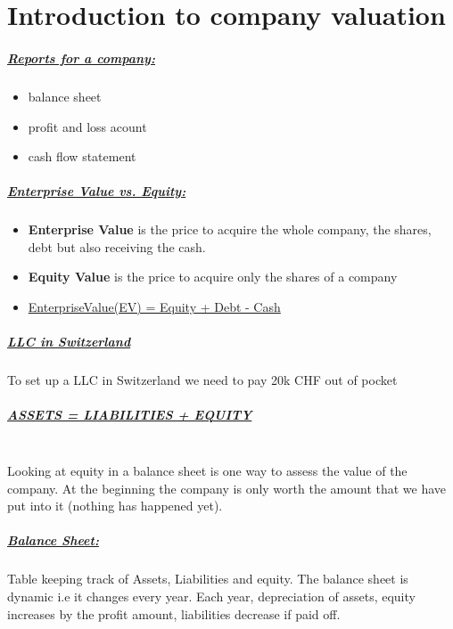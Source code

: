 \documentclass[8pt]{extreport}
\begin{document}
{\chapter{\Large{Introduction to company valuation}}
\paragraph{\underline{Reports for a company:}}
\begin{itemize}
\item balance sheet
\item profit and loss acount 
\item cash flow statement
\end{itemize}

\paragraph{\underline{Enterprise Value vs. Equity:}}
\begin{itemize}
\item \textbf{Enterprise Value} is the price to acquire the whole company, the shares, debt but also receiving the cash.
\item \textbf{Equity Value} is the price to acquire only the shares of a company
\item \underline{ EnterpriseValue(EV) = Equity + Debt - Cash}
\end{itemize}

\paragraph{\underline{LLC in Switzerland}} To set up a LLC in Switzerland we need to pay 20k CHF out of pocket
\paragraph{\underline{ASSETS = LIABILITIES + EQUITY}\\ \\} Looking at equity in a balance sheet is one way to assess the value of the company. At the beginning the company is only worth the amount that we have put into it (nothing has happened yet).
\paragraph{\underline{Balance Sheet:}} Table keeping track of Assets, Liabilities and equity. The balance sheet is dynamic i.e it changes every year. Each year, depreciation of assets, equity increases by the profit amount, liabilities decrease if paid off.
}
\end{document}
